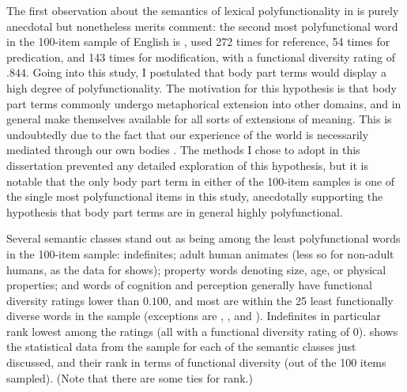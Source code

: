 The first observation about the semantics of lexical polyfunctionality in  is purely anecdotal but nonetheless merits comment: the second most polyfunctional word in the 100-item sample of English is , used 272 times for reference, 54 times for predication, and 143 times for modification, with a functional diversity rating of $.844$. Going into this study, I postulated that body part terms would display a high degree of polyfunctionality. The motivation for this hypothesis is that body part terms commonly undergo metaphorical extension into other domains, and in general make themselves available for all sorts of extensions of meaning. This is undoubtedly due to the fact that our experience of the world is necessarily mediated through our own bodies \parencite{LakoffJohnson1980}. The methods I chose to adopt in this dissertation prevented any detailed exploration of this hypothesis, but it is notable that the only body part term in either of the 100-item samples is one of the single most polyfunctional items in this study, anecdotally supporting the hypothesis that body part terms are in general highly polyfunctional.

Several semantic classes stand out as being among the least polyfunctional words in the 100-item  sample: indefinites; adult human animates (less so for non-adult humans, as the data for  shows); property words denoting size, age, or physical properties; and words of cognition and perception generally have functional diversity ratings lower than $0.100$, and most are within the 25 least functionally diverse words in the sample (exceptions are , , and ). Indefinites in particular rank lowest among the ratings (all with a functional diversity rating of $0$).  shows the statistical data from the sample for each of the semantic classes just discussed, and their rank in terms of functional diversity (out of the 100 items sampled). (Note that there are some ties for rank.)

